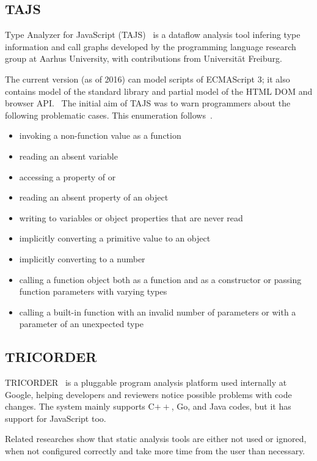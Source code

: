 \subsection{TAJS}
Type Analyzer for JavaScript (TAJS)~\cite{tajs} is a dataflow analysis tool infering type information and call graphs developed by the programming language research group at Aarhus University, with contributions from Universität Freiburg.

The current version (as of 2016) can model scripts of ECMAScript 3; it also contains model of the standard library and partial model of the HTML DOM and browser API.~\cite{tajs-git} The initial aim of TAJS was to warn programmers about the following problematic cases. This enumeration follows~\cite{jensen_type_2009}.

\begin{itemize}[topsep=0pt]
  \item invoking a non-function value as a function
  \item reading an absent variable
  \item accessing a property of  or 
  \item reading an absent property of an object
  \item writing to variables or object properties that are never read
  \item implicitly converting a primitive value to an object
  \item implicitly converting  to a number
  \item calling a function object both as a function and as a constructor or passing function parameters with varying types
  \item calling a built-in function with an invalid number of parameters or with a parameter of an unexpected type
\end{itemize}


\subsection{TRICORDER}
TRICORDER~\cite{tricorder} is a pluggable program analysis platform used internally at Google, helping developers and reviewers notice possible problems with code changes. The system mainly supports C$++$, Go, and Java codes, but it has support for JavaScript too.

Related researches show that static analysis tools are either not used or ignored, when not configured correctly and take more time from the user than necessary. 



